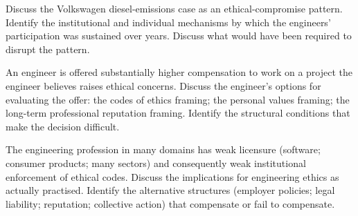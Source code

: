 \begin{exercise}
Discuss the Volkswagen diesel-emissions case as an ethical-compromise pattern. Identify the institutional and individual mechanisms by which the engineers' participation was sustained over years. Discuss what would have been required to disrupt the pattern.
\end{exercise}

\begin{exercise}
An engineer is offered substantially higher compensation to work on a project the engineer believes raises ethical concerns. Discuss the engineer's options for evaluating the offer: the codes of ethics framing; the personal values framing; the long-term professional reputation framing. Identify the structural conditions that make the decision difficult.
\end{exercise}

\begin{exercise}
The engineering profession in many domains has weak licensure (software; consumer products; many sectors) and consequently weak institutional enforcement of ethical codes. Discuss the implications for engineering ethics as actually practised. Identify the alternative structures (employer policies; legal liability; reputation; collective action) that compensate or fail to compensate.
\end{exercise}
